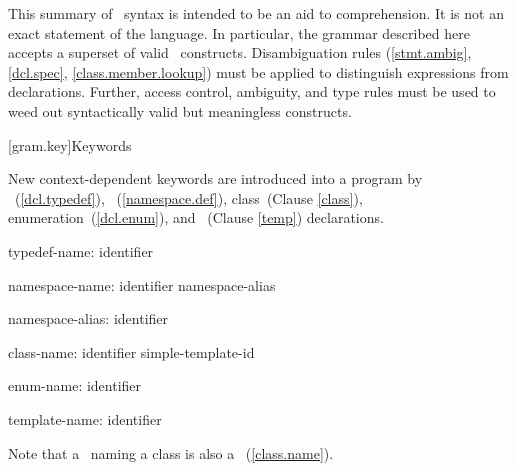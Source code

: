 
\begin{paras}

\pnum
{}%
%
This summary of \Cpp\  syntax is intended to be an aid to comprehension.
It is not an exact statement of the language.
In particular, the grammar described here accepts
a superset of valid \Cpp\  constructs.
Disambiguation rules (\ref{stmt.ambig}, \ref{dcl.spec}, \ref{class.member.lookup})
must be applied to distinguish expressions from declarations.
Further, access control, ambiguity, and type rules must be used
to weed out syntactically valid but meaningless constructs.

[gram.key]{Keywords}

\pnum
{}%
New context-dependent keywords are introduced into a program by
~(\ref{dcl.typedef}),
~(\ref{namespace.def}),
class~(Clause \ref{class}), enumeration~(\ref{dcl.enum}), and
~(Clause \ref{temp})
declarations.

\begin{ncbnf}
typedef-name:\br
	identifier
\end{ncbnf}

\begin{ncbnf}
namespace-name:\br
	identifier\br
	namespace-alias

namespace-alias:\br
	identifier
\end{ncbnf}

\begin{ncbnf}
class-name:\br
	identifier\br
	simple-template-id
\end{ncbnf}

\begin{ncbnf}
enum-name:\br
	identifier
\end{ncbnf}

\begin{ncbnf}
template-name:\br
	identifier
\end{ncbnf}

Note that a
\ 
naming a class is also a
\ 
(\ref{class.name}).

\end{paras}

\FlushAndPrintGrammar
